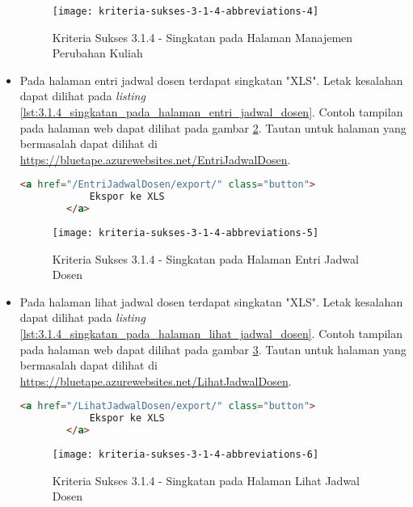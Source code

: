 \begin{itemize}
    \begin{figure}[H]
        \centering  
        \texttt{[image: kriteria-sukses-3-1-4-abbreviations-4]}  
        \caption[Kriteria Sukses 3.1.4 - Singkatan pada Halaman Manajemen Perubahan Kuliah]{Kriteria Sukses 3.1.4 - Singkatan pada Halaman Manajemen Perubahan Kuliah}
        \label{fig:3.1.4_abbreviations_4}  
    \end{figure}
    
    \item Pada halaman entri jadwal dosen terdapat singkatan "XLS". Letak kesalahan dapat dilihat pada \textit{listing} \ref{lst:3.1.4_singkatan_pada_halaman_entri_jadwal_dosen}. Contoh tampilan pada halaman web dapat dilihat pada gambar \ref{fig:3.1.4_abbreviations_5}. Tautan untuk halaman yang bermasalah dapat dilihat di \url{https://bluetape.azurewebsites.net/EntriJadwalDosen}.
    \begin{lstlisting}[frame=single, label={lst:3.1.4_singkatan_pada_halaman_entri_jadwal_dosen}, language=HTML, caption=Kriteria Sukses 3.1.4 - Singkatan pada Halaman Entri Jadwal Dosen]
        <a href="/EntriJadwalDosen/export/" class="button">
            Ekspor ke XLS
        </a>
    \end{lstlisting}

    \begin{figure}[H]
        \centering  
        \texttt{[image: kriteria-sukses-3-1-4-abbreviations-5]}  
        \caption[Kriteria Sukses 3.1.4 - Singkatan pada Halaman Entri Jadwal Dosen]{Kriteria Sukses 3.1.4 - Singkatan pada Halaman Entri Jadwal Dosen}
        \label{fig:3.1.4_abbreviations_5}  
    \end{figure}
    
    \item Pada halaman lihat jadwal dosen terdapat singkatan "XLS". Letak kesalahan dapat dilihat pada \textit{listing} \ref{lst:3.1.4_singkatan_pada_halaman_lihat_jadwal_dosen}. Contoh tampilan pada halaman web dapat dilihat pada gambar \ref{fig:3.1.4_abbreviations_6}. Tautan untuk halaman yang bermasalah dapat dilihat di \url{https://bluetape.azurewebsites.net/LihatJadwalDosen}.
    \begin{lstlisting}[frame=single, label={lst:3.1.4_singkatan_pada_halaman_lihat_jadwal_dosen}, language=HTML, caption=Kriteria Sukses 3.1.4 - Singkatan pada Halaman Lihat Jadwal Dosen]
        <a href="/LihatJadwalDosen/export/" class="button">
            Ekspor ke XLS
        </a>
    \end{lstlisting}

    \begin{figure}[H]
        \centering  
        \texttt{[image: kriteria-sukses-3-1-4-abbreviations-6]}  
        \caption[Kriteria Sukses 3.1.4 - Singkatan pada Halaman Lihat Jadwal Dosen]{Kriteria Sukses 3.1.4 - Singkatan pada Halaman Lihat Jadwal Dosen}
        \label{fig:3.1.4_abbreviations_6}  
    \end{figure}
\end{itemize}

